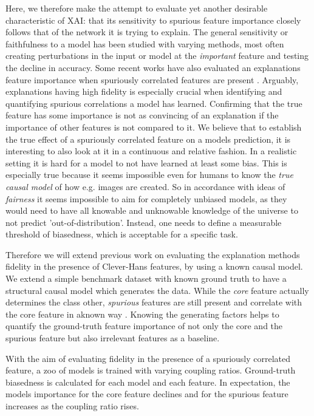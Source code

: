 Here, we therefore make the attempt to evaluate yet another desirable characteristic of XAI: that its sensitivity to spurious feature importance closely follows that of the network it is trying to explain. The general sensitivity or faithfulness to a model has been studied with varying methods, most often creating perturbations in the input or model at the \textit{important} feature and testing the decline in accuracy. Some recent works have also evaluated an explanations feature importance when spuriously correlated features are present \cite{Yang2019,Kim2018,Parafita2019,Reimers2020,Singla2022}. Arguably, explanations having high fidelity is especially crucial when identifying and quantifying spurious correlations a model has learned. Confirming that the true feature has some importance is not as convincing of an explanation if the importance of other features is not compared to it.
We believe that to establish the true effect of a spuriously correlated feature on a models prediction, it is interesting to also look at it in a continuous and relative fashion. 
In a realistic setting it is hard for a model to not have learned at least some bias. This is especially true because it seems impossible even for humans to know the \textit{true causal model} of how e.g. images are created. So in accordance with ideas of \textit{fairness} it seems impossible to aim for completely unbiased models, as they would need to have all knowable and unknowable knowledge of the universe to not predict 'out-of-distribution'. Instead, one needs to define a measurable threshold of biasedness, which is acceptable for a specific task.  

Therefore we will extend previous work on evaluating the explanation methods fidelity in the presence of Clever-Hans features, by using a known causal model. We extend a simple benchmark dataset with known ground truth to have a structural causal model which generates the data.
While the \textit{core} feature actually determines the class other, \textit{spurious} features are still present and correlate with the core feature in aknown way \cite{Singla2022}.
Knowing the generating factors helps to quantify the ground-truth feature importance of not only the core and the spurious feature but also irrelevant features as a baseline.


With the aim of evaluating fidelity in the presence of a spuriously correlated feature, a zoo of models is trained with varying coupling ratios. Ground-truth biasedness is calculated for each model and each feature. In expectation, the models importance for the core feature declines and for the spurious feature increases as the coupling ratio rises. 


